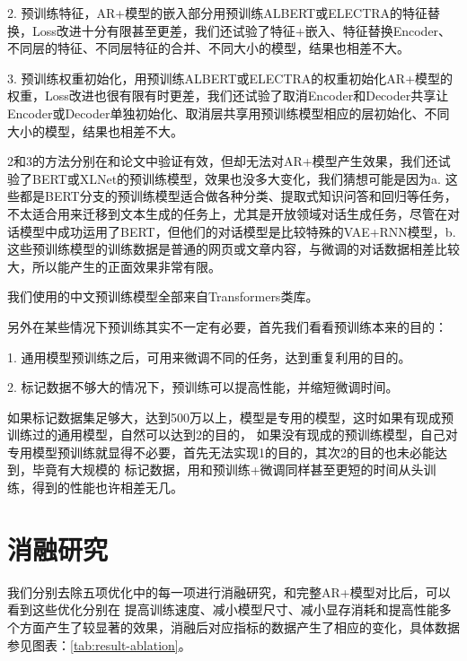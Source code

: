 \documentclass[letterpaper]{article} %
\DeclareRobustCommand{\citeext}[1]{\cite[#1]{#1}}
\begin{document}
\begin{CJK*}{UTF8}{gbsn}
2. 预训练特征\citeext{Devlin2019}，AR+模型的嵌入部分用预训练ALBERT\citeext{Lan2019}或ELECTRA\citeext{Clark2020}的特征替换，Loss改进十分有限甚至更差，我们还试验了特征+嵌入、特征替换Encoder、不同层的特征、不同层特征的合并、不同大小的模型，结果也相差不大。

3. 预训练权重初始化\citeext{Ziegler2019}，用预训练ALBERT或ELECTRA的权重初始化AR+模型的权重，Loss改进也很有限有时更差，我们还试验了取消Encoder和Decoder共享让Encoder或Decoder单独初始化、取消层共享用预训练模型相应的层初始化、不同大小的模型，结果也相差不大。

2和3的方法分别在\citeext{Devlin2019}和\citeext{Zhao2019}论文中验证有效，但却无法对AR+模型产生效果，我们还试验了BERT或XLNet\citeext{Yang2019}的预训练模型，效果也没多大变化，我们猜想可能是因为a. 这些都是BERT分支的预训练模型适合做各种分类、提取式知识问答和回归等任务，不太适合用来迁移到文本生成的任务上，尤其是开放领域对话生成任务，尽管\citeext{Zhao2019}在对话模型中成功运用了BERT，但他们的对话模型是比较特殊的VAE+RNN模型，b. 这些预训练模型的训练数据是普通的网页或文章内容，与微调的对话数据相差比较大，所以能产生的正面效果非常有限。

我们使用的中文预训练模型全部来自Transformers类库\citeext{Wolf2019HuggingFacesTS}。

另外在某些情况下预训练其实不一定有必要，首先我们看看预训练本来的目的：

1. 通用模型预训练之后，可用来微调不同的任务，达到重复利用的目的。

2. 标记数据不够大的情况下，预训练可以提高性能，并缩短微调时间。

如果标记数据集足够大，达到500万以上，模型是专用的模型，这时如果有现成预训练过的通用模型，自然可以达到2的目的，
如果没有现成的预训练模型，自己对专用模型预训练就显得不必要，首先无法实现1的目的，其次2的目的也未必能达到，毕竟有大规模的
标记数据，用和预训练+微调同样甚至更短的时间从头训练，得到的性能也许相差无几。


\section[Ablation Study]{消融研究} 
我们分别去除五项优化中的每一项进行消融研究，和完整AR+模型对比后，可以看到这些优化分别在%
提高训练速度、减小模型尺寸、减小显存消耗和提高性能多个方面产生了较显著的效果，消融后对应指标的数据产生了相应的变化，具体数据参见图表：\ref{tab:result-ablation}。
 

\end{CJK*}
\end{document}
